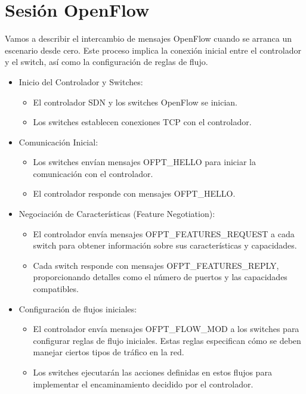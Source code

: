 \documentclass[a4paper, 12pt]{book}
\begin{document}
	\section{Sesión OpenFlow}
	Vamos a describir el intercambio de mensajes OpenFlow cuando se arranca un escenario desde cero. Este proceso implica la conexión inicial entre el controlador y el switch, así como la configuración de reglas de flujo. 
	
	\begin{itemize}
		\item Inicio del Controlador y Switches:
		\begin{itemize}
			\item El controlador SDN y los switches OpenFlow se inician.
			\item Los switches establecen conexiones TCP con el controlador.
		\end{itemize}
		
		\item Comunicación Inicial:
		\begin{itemize}
			\item Los switches envían mensajes OFPT\_HELLO para iniciar la comunicación con el controlador.
			\item El controlador responde con mensajes OFPT\_HELLO.
		\end{itemize}
		
		\item Negociación de Características (Feature Negotiation):
		\begin{itemize}
			\item El controlador envía mensajes OFPT\_FEATURES\_REQUEST
			a cada switch para obtener información sobre sus características y capacidades.
			\item Cada switch responde con mensajes OFPT\_FEATURES\_REPLY, proporcionando detalles como
			el número de puertos y las capacidades compatibles.
		\end{itemize}
		
		\item Configuración de flujos iniciales:
		\begin{itemize}
			\item El controlador envía mensajes OFPT\_FLOW\_MOD a los switches para configurar reglas
			de flujo iniciales. Estas reglas especifican cómo se deben manejar ciertos tipos de tráfico en la red.
			\item Los switches ejecutarán las acciones definidas en estos flujos para implementar el encaminamiento decidido por el controlador. 
		\end{itemize}
	

\end{itemize}
\end{document}
